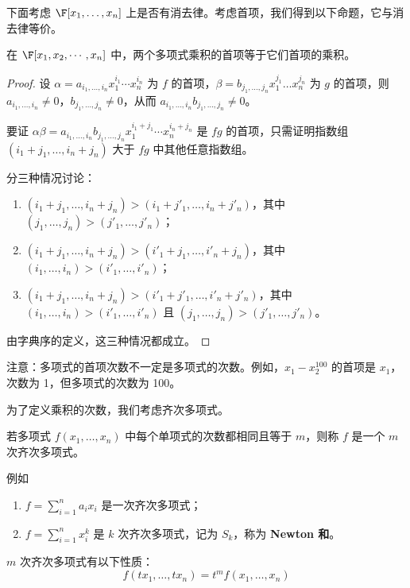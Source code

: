下面考虑 \( \F[x_1,\dots,x_n] \) 上是否有消去律。考虑首项，我们得到以下命题，它与消去律等价。
\begin{proposition}
	在 \( \F[x_1,x_2,\cdots,x_n] \) 中，两个多项式乘积的首项等于它们首项的乘积。
\end{proposition}
\begin{proof}
	设 \( \alpha = a_{i_1,\dots,i_n} x_1^{i_1} \cdots x_n^{i_n} \) 为 \( f \) 的首项，\( \beta = b_{j_1,\dots,j_n} x_1^{j_1} \dots x_n^{j_n} \) 为 \( g \) 的首项，则 \( a_{i_1,\dots,i_n} \neq 0 \)，\( b_{j_1,\dots,j_n} \neq 0 \)，从而 \( a_{i_1,\dots,i_n} b_{j_1,\dots,j_n} \neq 0 \)。
	
	要证 \( \alpha\beta = a_{i_1,\dots,i_n} b_{j_1,\dots,j_n} x_1^{i_1+j_1} \cdots x_n^{i_n+j_n} \) 是 \( fg \) 的首项，只需证明指数组 \( (i_1+j_1,\dots,i_n+j_n) \) 大于 \( fg \) 中其他任意指数组。
	
	分三种情况讨论：
	\begin{enumerate}
		\item \( (i_1+j_1,\dots,i_n+j_n) > (i_1+j'_1,\dots,i_n+j'_n) \)，其中 \( (j_1,\dots,j_n) > (j'_1,\dots,j'_n) \)；
		\item \( (i_1+j_1,\dots,i_n+j_n) > (i'_1+j_1,\dots,i'_n+j_n) \)，其中 \( (i_1,\dots,i_n) > (i'_1,\dots,i'_n) \)；
		\item \( (i_1+j_1,\dots,i_n+j_n) > (i'_1+j'_1,\dots,i'_n+j'_n) \)，其中 \( (i_1,\dots,i_n) > (i'_1,\dots,i'_n) \) 且 \( (j_1,\dots,j_n) > (j'_1,\dots,j'_n) \)。
	\end{enumerate}
	
	由字典序的定义，这三种情况都成立。
\end{proof}


注意：多项式的首项次数不一定是多项式的次数。例如，\( x_1 - x_2^{100} \) 的首项是 \( x_1 \)，次数为 1，但多项式的次数为 100。

为了定义乘积的次数，我们考虑齐次多项式。



\begin{definition}\label{p1:concept:c1-l1379}
	若多项式 \( f(x_1,\dots,x_n) \) 中每个单项式的次数都相同且等于 \( m \)，则称 \( f \) 是一个 \( m \) 次齐次多项式。
\end{definition}
例如
\begin{enumerate}
	\item \( f = \sum\limits_{i=1}^n a_i x_i \) 是一次齐次多项式；
	\item{}\label{p1:concept:c1-l1385}\( f = \sum\limits_{i=1}^n x_i^k \) 是 \( k \) 次齐次多项式，记为 \( S_k \)，称为 \textbf{Newton 和}。  
\end{enumerate}
\( m \) 次齐次多项式有以下性质：
\[
f(tx_1,\dots,tx_n) = t^m f(x_1,\dots,x_n)
\]

